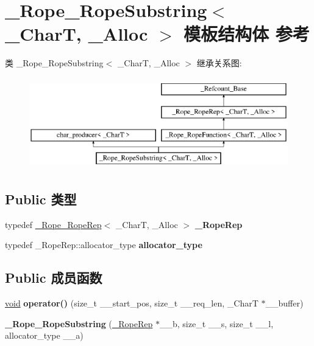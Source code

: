 \hypertarget{struct___rope___rope_substring}{}\section{\+\_\+\+Rope\+\_\+\+Rope\+Substring$<$ \+\_\+\+CharT, \+\_\+\+Alloc $>$ 模板结构体 参考}
\label{struct___rope___rope_substring}
类 \+\_\+\+Rope\+\_\+\+Rope\+Substring$<$ \+\_\+\+CharT, \+\_\+\+Alloc $>$ 继承关系图\+:\begin{figure}[H]
\begin{center}
\leavevmode
\includegraphics[height=4.000000cm]{struct___rope___rope_substring}
\end{center}
\end{figure}
\subsection*{Public 类型}
\begin{DoxyCompactItemize}
\item 
\mbox{\label{struct___rope___rope_substring_a5c8fc8462639845197a68b097572bf1c}} 
typedef \hyperlink{struct___rope___rope_rep}{\+\_\+\+Rope\+\_\+\+Rope\+Rep}$<$ \+\_\+\+CharT, \+\_\+\+Alloc $>$ {\bfseries \+\_\+\+Rope\+Rep}
\item 
\mbox{\label{struct___rope___rope_substring_acb602001962307b531cb79958178f735}} 
typedef \+\_\+\+Rope\+Rep\+::allocator\+\_\+type {\bfseries allocator\+\_\+type}
\end{DoxyCompactItemize}
\subsection*{Public 成员函数}
\begin{DoxyCompactItemize}
\item 
\mbox{\label{struct___rope___rope_substring_a97fd7e87e5dc801957765a0766c5d343}} 
\hyperlink{interfacevoid}{void} {\bfseries operator()} (size\+\_\+t \+\_\+\+\_\+start\+\_\+pos, size\+\_\+t \+\_\+\+\_\+req\+\_\+len, \+\_\+\+CharT $\ast$\+\_\+\+\_\+buffer)
\item 
\mbox{\label{struct___rope___rope_substring_a60b522be17f404d97ca252face794c0c}} 
{\bfseries \+\_\+\+Rope\+\_\+\+Rope\+Substring} (\hyperlink{struct___rope___rope_rep}{\+\_\+\+Rope\+Rep} $\ast$\+\_\+\+\_\+b, size\+\_\+t \+\_\+\+\_\+s, size\+\_\+t \+\_\+\+\_\+l, allocator\+\_\+type \+\_\+\+\_\+a)
\end{DoxyCompactItemize}
